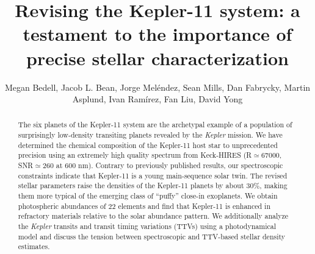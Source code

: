 \documentclass[oneside]{emulateapj}
\begin{document}
\graphicspath{ {figures/} }

\title{Revising the Kepler-11 system: a testament to the importance of precise stellar characterization }

\author{Megan Bedell,
Jacob L. Bean,
Jorge Mel\'{e}ndez,
Sean Mills,
Dan Fabrycky,
Martin Asplund,
Ivan Ram\'{i}rez,
Fan Liu,
David Yong}




\begin{abstract}

The six planets of the Kepler-11 system are the archetypal example of a population of surprisingly low-density transiting planets revealed by the \textit{Kepler} mission. We have determined the chemical composition of the Kepler-11 host star to unprecedented precision using an extremely high quality spectrum from Keck-HIRES (R$\simeq$67000, SNR$\simeq$260 at 600 nm). Contrary to previously published results, our spectroscopic constraints indicate that Kepler-11 is a young main-sequence solar twin. The revised stellar parameters raise the densities of the Kepler-11 planets by about 30\%, making them more typical of the emerging class of ``puffy'' close-in exoplanets. We obtain photospheric abundances of 22 elements and find that Kepler-11 is enhanced in refractory materials relative to the solar abundance pattern. We additionally analyze the \textit{Kepler} transits and transit timing variations (TTVs) using a photodynamical model and discuss the tension between spectroscopic and TTV-based stellar density estimates.

\end{abstract}
\end{document}
